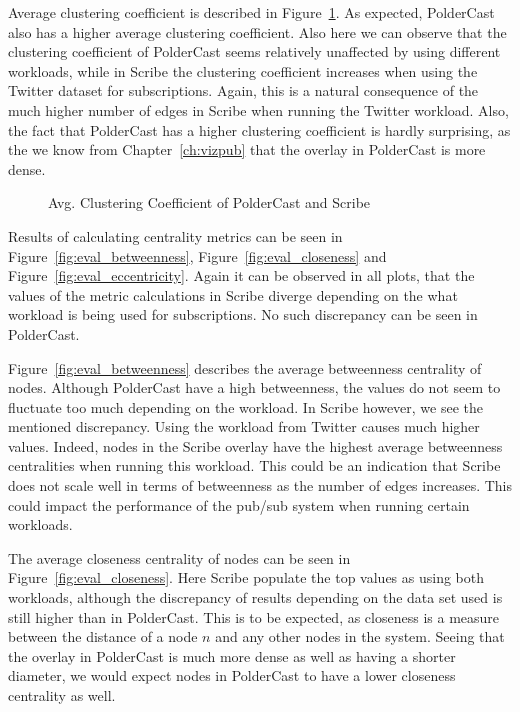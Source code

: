 Average clustering coefficient is described in Figure~\ref{fig:eval_cc}.
As expected, PolderCast also has a higher average clustering
coefficient. Also here we can observe that the clustering coefficient of
PolderCast seems relatively unaffected by using different workloads,
while in Scribe the clustering coefficient increases when using the
Twitter dataset for subscriptions. Again, this is a natural consequence
of the much higher number of edges in Scribe when running the Twitter
workload. Also, the fact that PolderCast has a higher clustering
coefficient is hardly surprising, as the we know from
Chapter~\ref{ch:vizpub} that the overlay in PolderCast is more dense.

\begin{figure}[H]
    \centering
    
    \caption{Avg. Clustering Coefficient of PolderCast and Scribe}
    \label{fig:eval_cc}
\end{figure}


Results of calculating centrality metrics can be seen in
Figure~\ref{fig:eval_betweenness}, Figure~\ref{fig:eval_closeness} and
Figure~\ref{fig:eval_eccentricity}. Again it can be observed in all
plots, that the values of the metric calculations in Scribe diverge
depending on the what workload is being used for subscriptions. No such
discrepancy can be seen in PolderCast.

Figure~\ref{fig:eval_betweenness} describes the average betweenness
centrality of nodes. Although PolderCast have a high betweenness, the
values do not seem to fluctuate too much depending on the workload. In
Scribe however, we see the mentioned discrepancy. Using the workload
from Twitter causes much higher values. Indeed, nodes in the Scribe
overlay have the highest average betweenness centralities when running
this workload. This could be an indication that Scribe does not scale
well in terms of betweenness as the number of edges increases. This
could impact the performance of the pub/sub system when running certain
workloads.

The average closeness centrality of nodes can be seen in
Figure~\ref{fig:eval_closeness}. Here Scribe populate the top values as
using both workloads, although the discrepancy of results depending on
the data set used is still higher than in PolderCast. This is to be
expected, as closeness is a measure between the distance of a node
$n$ and any other nodes in the system. Seeing that the overlay in
PolderCast is much more dense as well as having a shorter diameter, we
would expect nodes in PolderCast to have a lower closeness centrality as
well.

